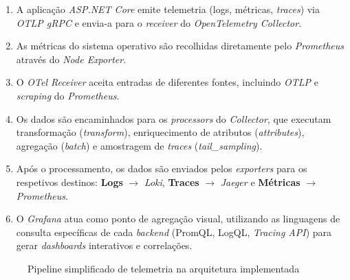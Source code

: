 \begin{enumerate}
    \item A aplicação \textit{ASP.NET Core} emite telemetria (logs, métricas, \textit{traces}) via \textit{OTLP gRPC} e envia-a para o \textit{receiver} do \textit{OpenTelemetry Collector}.
    \item As métricas do sistema operativo são recolhidas diretamente pelo \textit{Prometheus} através do \textit{Node Exporter}.
    \item O \textit{OTel Receiver} aceita entradas de diferentes fontes, incluindo \textit{OTLP} e \textit{scraping} do \textit{Prometheus}.
    \item Os dados são encaminhados para os \textit{processors} do \textit{Collector}, que executam transformação (\textit{transform}), enriquecimento de atributos (\textit{attributes}), agregação (\textit{batch}) e amostragem de \textit{traces} (\textit{tail\_sampling}).
    \item Após o processamento, os dados são enviados pelos \textit{exporters} para os respetivos destinos: \textbf{Logs} $\rightarrow$ \textit{Loki}, \textbf{Traces} $\rightarrow$ \textit{Jaeger} e \textbf{Métricas} $\rightarrow$ \textit{Prometheus}.
    \item O \textit{Grafana} atua como ponto de agregação visual, utilizando as linguagens de consulta específicas de cada \textit{backend} (PromQL, LogQL, \textit{Tracing API}) para gerar \textit{dashboards} interativos e correlações.
\end{enumerate}


\begin{figure}[H]
\centering
{}
\caption{Pipeline simplificado de telemetria na arquitetura implementada}
\label{fig:pipeline_otel}
\end{figure}


